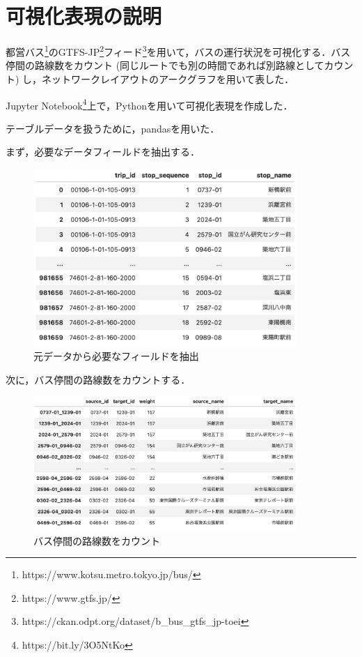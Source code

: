 \documentclass[12pt,a4paper,dvipdfmx,titlepage]{jsarticle}
\begin{document}
\section*{可視化表現の説明}
都営バス\footnote{https://www.kotsu.metro.tokyo.jp/bus/}のGTFS-JP\footnote{https://www.gtfs.jp/}フィード\footnote{https://ckan.odpt.org/dataset/b\_bus\_gtfs\_jp-toei}を用いて，バスの運行状況を可視化する．バス停間の路線数をカウント (同じルートでも別の時間であれば別路線としてカウント) し，ネットワークレイアウトのアークグラフを用いて表した．

Jupyter Notebook\footnote{https://bit.ly/3O5NtKo}上で，Pythonを用いて可視化表現を作成した．

テーブルデータを扱うために，pandasを用いた．

まず，必要なデータフィールドを抽出する．
\begin{figure}[H]
    \centering
    \includegraphics[width=10cm]{./img/table1.png}
    \caption{元データから必要なフィールドを抽出}
    \label{fig:table1}
\end{figure}

次に，バス停間の路線数をカウントする．
\begin{figure}[H]
    \centering
    \includegraphics[width=10cm]{./img/table2.png}
    \caption{バス停間の路線数をカウント}
    \label{fig:table2}
\end{figure}
\end{document}
